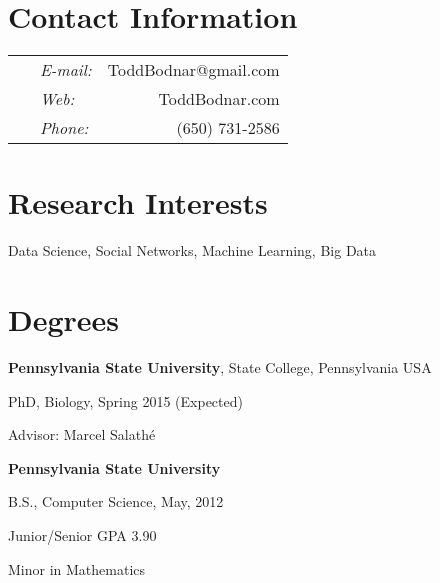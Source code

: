 \documentclass[margin,line]{res}
\newenvironment{list1}{
  \begin{list}{\ding{113}}{%
      \setlength{\itemsep}{0in}
      \setlength{\parsep}{0in} \setlength{\parskip}{0in}
      \setlength{\topsep}{0in} \setlength{\partopsep}{0in} 
      \setlength{\leftmargin}{0.17in}}}{\end{list}}
\begin{document}

\begin{resume}
\section{\sc Contact Information}
\vspace{.05in}
\begin{tabular}{@{}p{3.7in}p{.5in} r }
\   &  {\it E-mail:}  & ToddBodnar@gmail.com \\         
\   &  {\it Web:}  & ToddBodnar.com \\
\  & {\it Phone:} & (650) 731-2586 \\
\end{tabular}


\section{\sc Research Interests}
Data Science, Social Networks, Machine Learning, Big Data
\ \\
\section{\sc Degrees}
{\bf Pennsylvania State University}, State College, Pennsylvania USA\\
\vspace*{-.1in}
\begin{list1}
\item[] PhD, Biology, Spring 2015 (Expected)
\item[] Advisor: Marcel Salath\'e
\end{list1}
{\bf Pennsylvania State University} \\
\vspace*{-.1in}
\begin{list1}
\item[] B.S., Computer Science,  May, 2012 
\item[] Junior/Senior GPA 3.90
\item[] Minor in Mathematics
\end{list1}


\end{resume}
\end{document}
